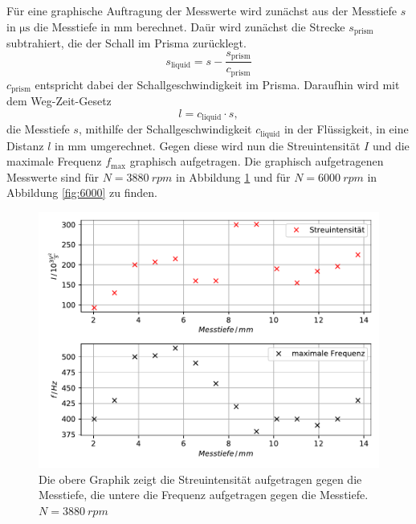 Für eine graphische Auftragung der Messwerte wird zunächst aus der Messtiefe $s$ in $\si{\micro\second}$ die Messtiefe in $\si{\milli\meter}$ berechnet.
Daür wird zunächst die Strecke $s_\text{prism}$ subtrahiert, die der Schall im Prisma zurücklegt.
\begin{equation*}
 s_\text{liquid} = s - \frac{s_\text{prism}}{c_\text{prism}}
\end{equation*}
$c_\text{prism}$ entspricht dabei der Schallgeschwindigkeit im Prisma.
Daraufhin wird mit dem Weg-Zeit-Gesetz
\begin{equation*}
l = c_\text{liquid} \cdot s,
\end{equation*}
die Messtiefe $s$, mithilfe der Schallgeschwindigkeit $c_\text{liquid}$ in der Flüssigkeit, in eine Distanz $l$ in $\si{\milli\meter}$ umgerechnet.
Gegen diese wird nun die Streuintensität $I$ und die maximale Frequenz $f_\text{max}$ graphisch aufgetragen.
Die graphisch aufgetragenen Messwerte sind für $N = \SI{3880}{rpm}$ in Abbildung \ref{fig:3880} und für $N = \SI{6000}{rpm}$ in Abbildung \ref{fig:6000} zu finden.

\begin{figure}
    \centering
    \includegraphics[width=\textwidth]{content/data/depth_3880.pdf}
    \caption{Die obere Graphik zeigt die Streuintensität aufgetragen gegen die Messtiefe, die untere die Frequenz aufgetragen gegen die Messtiefe. $N=\SI{3880}{rpm}$}
    \label{fig:3880}
\end{figure}

